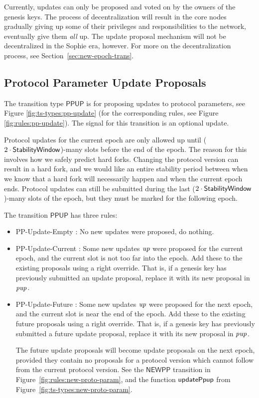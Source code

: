 Currently, updates can only be proposed and voted on by the owners of the genesis keys.
The process of decentralization will result in the core nodes gradually giving up
some of their privileges and responsibilities to the network,
eventually give them \textit{all} up.
The update proposal mechanism will not be decentralized in the Sophie era, however.
For more on the decentralization process, see Section~\ref{sec:new-epoch-trans}.

\subsection{Protocol Parameter Update Proposals}
\label{sec:pp-proposals}

The transition type $\mathsf{PPUP}$ is for proposing updates to protocol
parameters, see Figure \ref{fig:ts-types:pp-update} (for the corresponding rules,
see Figure \ref{fig:rules:pp-update}).
The signal for this transition is an optional update.

Protocol updates for the current epoch are only allowed up until
($2\cdot\mathsf{StabilityWindow}$)-many slots before the end of the epoch.
The reason for this involves how we safely predict hard forks.
Changing the protocol version can result in a hard fork, and we would like an
entire stability period between when we know that a hard fork will necessarily happen
and when the current epoch ends.
Protocol updates can still be submitted during the last
($2\cdot\mathsf{StabilityWindow}$)-many slots of the epoch, but they must
be marked for the following epoch.

The transition $\mathsf{PPUP}$ has three rules:
\begin{itemize}
  \item PP-Update-Empty : No new updates were proposed, do nothing.
  \item PP-Update-Current : Some new updates $\mathit{up}$ were proposed
    for the current epoch, and the current slot is not too far into the epoch.
    Add these to the existing proposals using a right override. That is, if a genesis key
    has previously submitted an update proposal, replace it with its new
    proposal in $\mathit{pup}$.
  \item PP-Update-Future : Some new updates $\mathit{up}$ were proposed
    for the next epoch, and the current slot is near the end of the epoch.
    Add these to the existing future proposals using a right override. That is, if a genesis key
    has previously submitted a future update proposal, replace it with its new
    proposal in $\mathit{pup}$.

    The future update proposals will become update proposals on the next epoch,
    provided they contain no proposals for a protocol version which cannot follow
    from the current protocol version.
    See the $\mathsf{NEWPP}$ transition in Figure~\ref{fig:rules:new-proto-param},
    and the function $\mathsf{updatePpup}$ from Figure~\ref{fig:ts-types:new-proto-param}.
\end{itemize}

